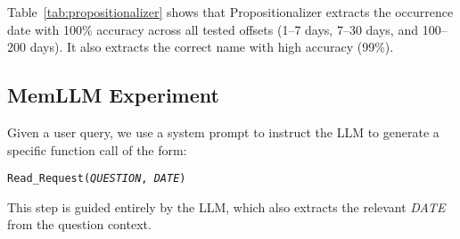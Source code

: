 \documentclass[11pt]{article}
\begin{document}
Table~\ref{tab:propositionalizer} shows that
Propositionalizer extracts the occurrence date
with 100\% accuracy across all tested offsets (1–7 days,
7–30 days, and 100–200 days). 
It also extracts the correct name with high accuracy (99\%).



\subsection{MemLLM Experiment}

Given a user query, we use a {system prompt} to instruct the LLM to generate a specific function call of the form:
\begin{center}
\texttt{Read\_Request(\textit{QUESTION}, \textit{DATE})}
\end{center}
This step is guided entirely by the LLM, which also extracts
the relevant \textit{DATE} from the question context.
\end{document}
